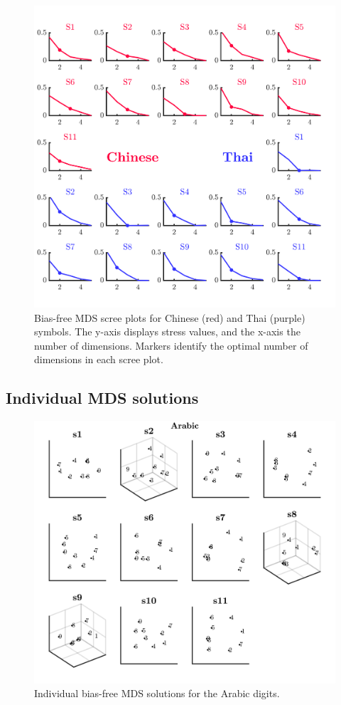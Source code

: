\begin{figure}[tbh]
\centering \includegraphics[scale = .7]{Figures/Appendix/AppD/MDSunbiasScree_2.jpg}
\caption{Bias-free MDS scree plots for Chinese (red) and Thai (purple) symbols. The y-axis displays stress values, and the x-axis the number of dimensions. Markers identify the optimal number of dimensions in each scree plot.}
\label{fig:Apx_ScreeChnThi}
\end{figure}

\clearpage \newpage
\subsection{Individual MDS solutions} 

\begin{figure}[tbh]
\centering \includegraphics[scale = .67]{Figures/Appendix/AppD/Indiv_MDS_1.jpg}
\caption{Individual bias-free MDS solutions for the Arabic digits.}
\label{fig:Apx_MDSenglish}
\end{figure}

